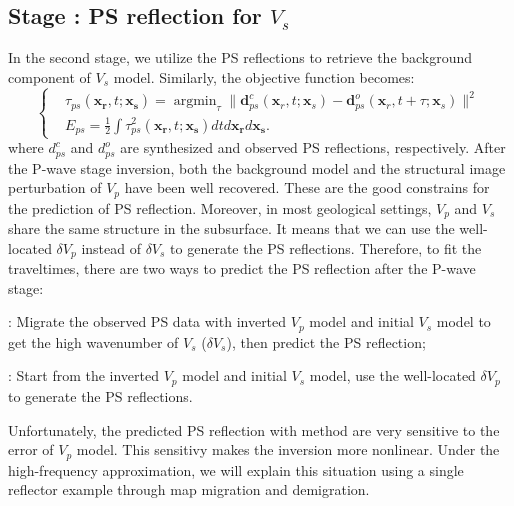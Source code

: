\subsection{Stage \uppercase\expandafter{}: PS reflection for $V_s$}
In the second stage, we utilize the PS reflections to retrieve the background component of
$V_s$ model. Similarly, the objective function becomes:
\begin{equation}
	\left\{
		\begin{aligned}
			&\tau_{ps}(\mathbf{x_r},t;\mathbf{x_s})=\mathop{\arg\min}_{\tau}
			\parallel\mathbf{d}^{c}_{ps}(\mathbf{x}_r,t;\mathbf{x}_s)-\mathbf{d}^{o}_{ps}(\mathbf{x}_r,t+\tau;\mathbf{x}_s)\parallel^2\\
			&E_{ps}=\frac{1}{2}\int\tau^2_{ps}(\mathbf{x_r},t;\mathbf{x_s})dtd\mathbf{x_r}d\mathbf{x_s}.
		\end{aligned}
	\right.
    \label{eq:ObjectivefunctionPP} 
\end{equation}
where $d^{c}_{ps}$ and $d^{o}_{ps}$ are synthesized and observed PS reflections, respectively.
After the P-wave stage inversion, both the background model and the structural image 
perturbation of $V_p$ have been well recovered. These are the good constrains for the prediction 
of PS reflection. Moreover, in
most geological settings, $V_p$ and $V_s$ share the same structure in the subsurface. 
It means that we can use the well-located $\delta V_p$ instead of $\delta V_s$ to generate the PS reflections. 
Therefore, to fit the traveltimes, there are two ways to predict the PS reflection after the P-wave stage:

{\bf{\uppercase\expandafter{}}}: Migrate the observed PS data with inverted $V_p$ model and
initial $V_s$ model to get the high wavenumber of $V_s$ ($\delta V_s$), then predict the PS reflection;

{\bf{\uppercase\expandafter{}}}: Start from the inverted $V_p$ model and initial $V_s$
model, use the well-located $\delta V_p$ to generate the PS reflections. 


Unfortunately, the predicted PS reflection with method {\bf\uppercase\expandafter{}} are
very sensitive to the error of $V_p$ model. This sensitivy makes the inversion more nonlinear.
Under the high-frequency approximation, we will explain this situation using a single reflector example through 
map migration and demigration.

